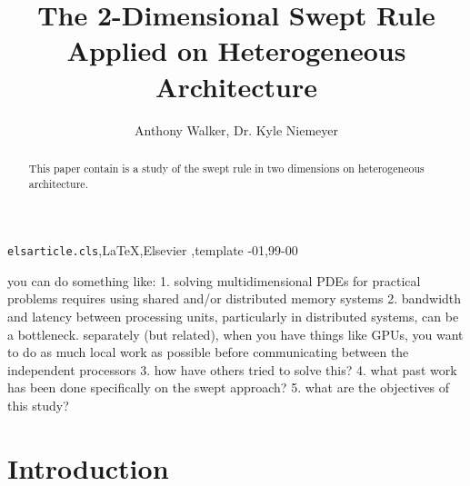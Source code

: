 \documentclass[review]{elsarticle}
\begin{document}
\begin{frontmatter}

\title{The 2-Dimensional Swept Rule Applied on Heterogeneous Architecture}

\author{Anthony Walker, Dr. Kyle Niemeyer}


%

\begin{abstract}
This paper contain is a study of the swept rule in two dimensions on heterogeneous
architecture.
\end{abstract}

\begin{keyword}
\texttt{elsarticle.cls}\sep \LaTeX\sep Elsevier \sep template
-01\sep  99-00
\end{keyword}

\end{frontmatter}

\linenumbers

you can do something like:
1. solving multidimensional PDEs for practical problems requires using shared and/or distributed memory systems
2.  bandwidth and latency between processing units, particularly in distributed systems, can be a bottleneck. separately (but related), when you have things like GPUs, you want to do as much local work as possible before communicating between the independent processors
3. how have others tried to solve this?
4. what past work has been done specifically on the swept approach?
5. what are the objectives of this study?

\section{Introduction}
\end{document}

